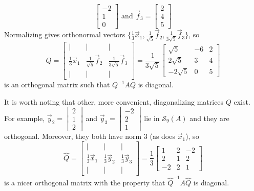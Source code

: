 \documentclass{ximera}
\begin{document}
\begin{example}
\begin{explanation}
\begin{equation*}
\begin{bmatrix}
-2 \\
1 \\
0
\end{bmatrix} \mbox{ and }  \vec{f}_{3} = \begin{bmatrix}
2 \\
4 \\
5
\end{bmatrix}
\end{equation*}
Normalizing gives orthonormal vectors $\{\frac{1}{3}\vec{x}_{1}, \frac{1}{\sqrt{5}}\vec{f}_{2}, \frac{1}{3\sqrt{5}}\vec{f}_{3}\}$, so
\begin{equation*}
Q = \begin{bmatrix}
| & | &  | \\
\frac{1}{3}\vec{x}_{1} & \frac{1}{\sqrt{5}}\vec{f}_{2} & \frac{1}{3\sqrt{5}}\vec{f}_{3} \\
| & | &  | 
\end{bmatrix} = \frac{1}{3\sqrt{5}}\begin{bmatrix}
\sqrt{5} & -6 & 2 \\
2\sqrt{5} & 3 & 4 \\
-2\sqrt{5} & 0 & 5
\end{bmatrix}
\end{equation*}
is an orthogonal matrix such that $Q^{-1}AQ$ is diagonal.


It is worth noting that other, more convenient, diagonalizing matrices $Q$ exist. For example, $\vec{y}_{2} = \begin{bmatrix}
2 \\
1 \\
2
\end{bmatrix}$ and $\vec{y}_{3} = \begin{bmatrix}
-2 \\
2 \\
1
\end{bmatrix}$
 lie in $\mathcal{S}_{9}(A)$ and they are orthogonal. Moreover, they both have norm $3$ (as does $\vec{x}_{1}$), so
\begin{equation*}
\hat{Q} = \begin{bmatrix}
| & | &  | \\
\frac{1}{3}\vec{x}_{1} & \frac{1}{3}\vec{y}_{2} & \frac{1}{3}\vec{y}_{3} \\
| & | &  |
\end{bmatrix} = \frac{1}{3}\begin{bmatrix}
1 & 2 & -2 \\
2 & 1 & 2 \\
-2 & 2 & 1
\end{bmatrix}
\end{equation*}
is a nicer orthogonal matrix with the property that $\hat{Q}^{-1}A\hat{Q}$ is diagonal.
\end{explanation}
\end{example}
\end{document}
